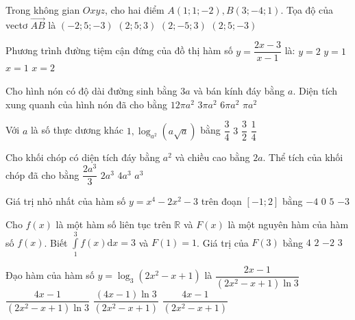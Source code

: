 \begin{ex}%
Trong không gian $O x y z$, cho hai điểm $A(1; 1;-2), B(3;-4; 1)$. Tọa độ của vectơ $\overrightarrow{AB}$ là
\choice
{$(-2; 5;-3)$}
{$(2; 5; 3)$}
{\True $(2;-5; 3)$}
{$(2; 5;-3)$}

\end{ex}
\begin{ex}%
Phương trình đường tiệm cận đứng của đồ thị hàm số $y=\dfrac{2 x-3}{x-1}$ là:
\choice
{$y=2$}
{$y=1$}
{\True $x=1$}
{$x=2$}

\end{ex}
\begin{ex}%
Cho hình nón có độ dài đường sinh bằng $3 a$ và bán kính đáy bằng $a$. Diện tích xung quanh của hình nón đã cho bằng
\choice
{$12\pi a^2$}
{\True $3\pi a^2$}
{$6\pi a^2$}
{$\pi a^2$}

\end{ex}
\begin{ex}%
Với $a$ là số thực dương khác $1, \log_{a^2}(a \sqrt{a})$ bằng
\choice
{\True $\dfrac{3}{4}$}
{$3$}
{$\dfrac{3}{2}$}
{$\dfrac{1}{4}$}

\end{ex}
\begin{ex}%
Cho khối chóp có diện tích đáy bằng $a^2$ và chiều cao bằng $2 a$. Thể tích của khối chóp đã cho bằng
\choice
{\True $\dfrac{2 a^3}{3}$}
{$2 a^3$}
{$4 a^3$}
{$a^3$}

\end{ex}
\begin{ex}%
Giá trị nhỏ nhất của hàm số $y=x^4-2 x^2-3$ trên đoạn $[-1; 2]$ bằng
\choice
{\True $-4$}
{$0$}
{$5$}
{$-3$}

\end{ex}
\begin{ex}%
Cho $f(x)$ là một hàm số liên tục trên $\mathbb{R}$ và $F(x)$ là một nguyên hàm của hàm số $f(x)$. Biết $\displaystyle\int\limits_1^3 f(x) \mathrm{d} x=3$ và $F(1)=1$. Giá trị của $F(3)$ bằng
\choice
 {\True $4$}
{$2$}
{$-2$}
{$3$}

\end{ex}
\begin{ex}%
Đạo hàm của hàm số $y=\log_3\left(2 x^2-x+1\right)$ là
\choice
{$\dfrac{2 x-1}{\left(2 x^2-x+1\right) \ln 3}$}
{\True $\dfrac{4 x-1}{\left(2 x^2-x+1\right) \ln 3}$}
{$\dfrac{(4 x-1) \ln 3}{\left(2 x^2-x+1\right)}$}
{$\dfrac{4 x-1}{\left(2 x^2-x+1\right)}$}

\end{ex}

